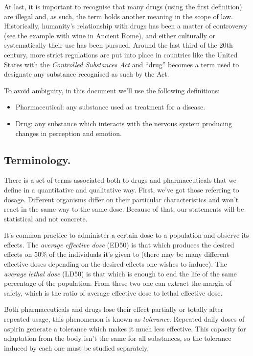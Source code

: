 At last, it is important to recognise that many drugs (using the first definition) are illegal and, as such, the term holds another meaning in the scope of law. Historically, humanity's relationship with drugs has been a matter of controversy (see the example with wine in Ancient Rome), and either culturally or systematically their use has been pursued. Around the last third of the 20th century, more strict regulations are put into place in countries like the United States with the \textit{Controlled Substances Act} and \enquote{drug} becomes a term used to designate any substance recognised as such by the Act.

To avoid ambiguity, in this document we'll use the following definitions:

\begin{itemize}
	\item Pharmaceutical: any substance used as treatment for a disease.
	\item Drug: any substance which interacts with the nervous system producing changes in perception and emotion.
\end{itemize}

\subsection{Terminology.}

There is a set of terms associated both to drugs and pharmaceuticals that we define in a quantitative and qualitative way. First, we've got those referring to dosage. Different organisms differ on their particular characteristics and won't react in the same way to the same dose. Because of that, our statements will be statistical and not concrete.

It's common practice to administer a certain dose to a population and observe its effects. The \textit{average effective dose} (ED50) is that which produces the desired effects on 50\% of the individuals it's given to (there may be many different effective doses depending on the desired effects one wishes to induce). The \textit{average lethal dose} (LD50) is that which is enough to end the life of the same percentage of the population. From these two one can extract the margin of safety, which is the ratio of average effective dose to lethal effective dose.

Both pharmaceuticals and drugs lose their effect partially or totally after repeated usage, this phenomenon is known as \textit{tolerance}. Repeated daily doses of aspirin generate a tolerance which makes it much less effective. This capacity for adaptation from the body isn't the same for all substances, so the tolerance induced by each one must be studied separately.

